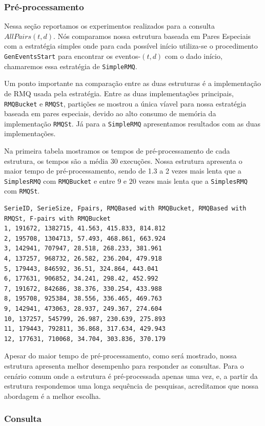 \documentclass[12pt]{article}
\begin{document}
\subsubsection{Pré-processamento}
Nessa seção reportamos os experimentos realizados para a consulta $AllPairs(t,d)$.
Nós comparamos nossa estrutura baseada em Pares Especiais com a estratégia simples onde para cada possível
início utiliza-se o procedimento {\tt GenEventsStart} para encontrar os eventos-$(t,d)$ com o dado início,
chamaremos essa estratégia de {\tt SimpleRMQ}.

Um ponto importante na comparação entre as duas estruturas é a implementação de RMQ usada pela estratégia. 
Entre as duas implementações principais, {\tt RMQBucket} e {\tt RMQSt}, partições se mostrou a única víavel para 
nossa estratégia baseada em pares especiais, devido ao alto consumo de memória da implementação {\tt RMQSt}.
Já para a {\tt SimpleRMQ} apresentamos resultados com as duas implementações.

Na primeira tabela mostramos os tempos de pré-processamento de cada estrutura, os tempos são a média 30 execuções.
Nossa estrutura apresenta o maior tempo de pré-processamento,  sendo de 1.3 a 2 vezes mais lenta que a {\tt SimplesRMQ}
 com {\tt RMQBucket} e entre $9$ e $20$ vezes mais lenta que a {\tt SimplesRMQ}  com {\tt RMQSt}.

\begin{verbatim}
SerieID, SerieSize, Fpairs, RMQBased with RMQBucket, RMQBased with RMQSt, F-pairs with RMQBucket
1, 191672, 1382715, 41.563, 415.833, 814.812
2, 195708, 1304713, 57.493, 468.861, 663.924
3, 142941, 707947, 28.518, 268.233, 381.961
4, 137257, 968732, 26.582, 236.204, 479.918
5, 179443, 846592, 36.51, 324.864, 443.041
6, 177631, 906852, 34.241, 298.42, 452.992
7, 191672, 842686, 38.376, 330.254, 433.988
8, 195708, 925384, 38.556, 336.465, 469.763
9, 142941, 473063, 28.937, 249.367, 274.604
10, 137257, 545799, 26.987, 230.639, 275.893
11, 179443, 792811, 36.868, 317.634, 429.943
12, 177631, 710068, 34.704, 303.836, 370.179
\end{verbatim}


Apesar do maior tempo de pré-processamento, como será mostrado, nossa estrutura apresenta
melhor desempenho para responder as consultas. Para o cenário comum onde a estrutura
é pré-processada apenas uma vez, e, a partir da estrutura respondemos uma longa
sequência de pesquisas, acreditamos que nossa abordagem é a melhor escolha.


\subsubsection{Consulta}
\end{document}
